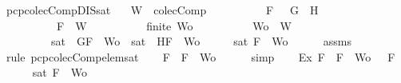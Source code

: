 \begin{isabellebody}
\ pcp{\isacharunderscore}colecComp{\isacharunderscore}DIS{\isacharunderscore}sat{}{\isacharcolon}\isanewline
\ \ \ {\isachardoublequoteopen}W\ {\isasymin}\ colecComp{\isachardoublequoteclose}\isanewline
\ \ \ \ \ \ \ \ \ \ {\isachardoublequoteopen}F\ {\isacharequal}\ \isactrlbold {\isasymnot}\ {\isacharparenleft}G\ \isactrlbold {\isasymand}\ H{\isacharparenright}{\isachardoublequoteclose}\isanewline
\ \ \ \ \ \ \ \ \ \ {\isachardoublequoteopen}F\ {\isasymin}\ W{\isachardoublequoteclose}\isanewline
\ \ \ \ \ \ \ \ \ \ {\isachardoublequoteopen}finite\ Wo{\isachardoublequoteclose}\isanewline
\ \ \ \ \ \ \ \ \ \ {\isachardoublequoteopen}Wo\ {\isasymsubseteq}\ W{\isachardoublequoteclose}\isanewline
\ \ \ \ \ \ \ \ \ {\isachardoublequoteopen}sat\ {\isacharparenleft}{\isacharbraceleft}\isactrlbold {\isasymnot}\ G{\isacharcomma}F{\isacharbraceright}\ {\isasymunion}\ Wo{\isacharparenright}\ {\isasymor}\ sat\ {\isacharparenleft}{\isacharbraceleft}\isactrlbold {\isasymnot}\ H{\isacharcomma}F{\isacharbraceright}\ {\isasymunion}\ Wo{\isacharparenright}{\isachardoublequoteclose}\isanewline
%
\isadelimproof
%
\endisadelimproof
%
\isatagproof
{}\isamarkupfalse%
\ {\isacharminus}\isanewline
\ \ \isamarkupfalse%
\ {\isachardoublequoteopen}sat\ {\isacharparenleft}{\isacharbraceleft}F{\isacharbraceright}\ {\isasymunion}\ Wo{\isacharparenright}{\isachardoublequoteclose}\isanewline
\ \ \ \ \isamarkupfalse%
\ assms{\isacharparenleft}{}{\isacharcomma}{}{\isacharcomma}{}{\isacharcomma}{}{\isacharparenright}\ \isamarkupfalse%
\ {\isacharparenleft}rule\ pcp{\isacharunderscore}colecComp{\isacharunderscore}elem{\isacharunderscore}sat{\isacharparenright}\isanewline
\ \ \isamarkupfalse%
\ {\isachardoublequoteopen}F\ {\isasymin}\ {\isacharbraceleft}F{\isacharbraceright}\ {\isasymunion}\ Wo{\isachardoublequoteclose}\isanewline
\ \ \ \ \isamarkupfalse%
\ simp\isanewline
\ \ \isamarkupfalse%
\ Ex{}{\isacharcolon}{\isachardoublequoteopen}{\isasymexists}{\isasymA}{\isachardot}\ {\isasymforall}F\ {\isasymin}\ {\isacharparenleft}{\isacharbraceleft}F{\isacharbraceright}\ {\isasymunion}\ Wo{\isacharparenright}{\isachardot}\ {\isasymA}\ {\isasymTurnstile}\ F{\isachardoublequoteclose}\isanewline
\ \ \ \ \isamarkupfalse%
\ {\isacartoucheopen}sat\ {\isacharparenleft}{\isacharbraceleft}F{\isacharbraceright}\ {\isasymunion}\ Wo{\isacharparenright}{\isacartoucheclose}\ \isamarkupfalse%

\end{isabellebody}
